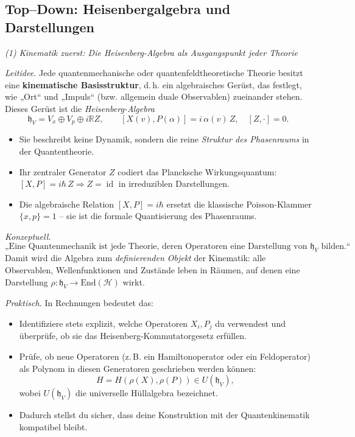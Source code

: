 \documentclass[10pt, letterpaper]{article}
\newcommand{\id}{\operatorname{id}}
\newcommand{\R}{\mathbb{R}}
\newcommand{\End}{\mathrm{End}}
\begin{document}
\pagebreak


\subsection{Top--Down: Heisenbergalgebra und Darstellungen}

\emph{(1) Kinematik zuerst: Die Heisenberg-Algebra als Ausgangspunkt jeder Theorie}

\emph{Leitidee.}
Jede quantenmechanische oder quantenfeldtheoretische Theorie besitzt eine
\textbf{kinematische Basisstruktur}, d.\,h. ein algebraisches Gerüst,
das festlegt, wie „Ort“ und „Impuls“ (bzw. allgemein duale Observablen)
zueinander stehen.
Dieses Gerüst ist die \emph{Heisenberg-Algebra}
\[
\mathfrak{h}_V = V_x \oplus V_p \oplus i\R Z,
\qquad [X(v),P(\alpha)] = i\,\alpha(v)\,Z,\quad [Z,\cdot]=0.
\]

\begin{itemize}
\item Sie beschreibt keine Dynamik, sondern die reine \emph{Struktur des Phasenraums}
      in der Quantentheorie.
\item Ihr zentraler Generator \(Z\) codiert das Plancksche Wirkungsquantum:
      \([X,P]=i\hbar\,Z\Rightarrow Z=\id\) in irreduziblen Darstellungen.
\item Die algebraische Relation \([X,P]=i\hbar\) ersetzt die klassische Poisson-Klammer
      \(\{x,p\}=1\) – sie ist die formale Quantisierung des Phasenraums.
\end{itemize}

\emph{Konzeptuell.}
\[
\text{„Eine Quantenmechanik ist jede Theorie, deren Operatoren eine Darstellung von }\mathfrak{h}_V\text{ bilden.“}
\]
Damit wird die Algebra zum \emph{definierenden Objekt} der Kinematik:
alle Observablen, Wellenfunktionen und Zustände leben in Räumen,
auf denen eine Darstellung \(\rho:\mathfrak{h}_V\to\End(\mathcal{H})\) wirkt.

\emph{Praktisch.}
In Rechnungen bedeutet das:
\begin{itemize}
\item Identifiziere stets explizit, welche Operatoren \(X_i,P_j\) du verwendest
      und überprüfe, ob sie das Heisenberg-Kommutatorgesetz erfüllen.
\item Prüfe, ob neue Operatoren (z.\,B. ein Hamiltonoperator oder ein Feldoperator)
      als Polynom in diesen Generatoren geschrieben werden können:
      \[
      H = H(\rho(X),\rho(P))\in U(\mathfrak{h}_V),
      \]
      wobei \(U(\mathfrak{h}_V)\) die universelle Hüllalgebra bezeichnet.
\item Dadurch stellst du sicher, dass deine Konstruktion mit der Quantenkinematik kompatibel bleibt.
\end{itemize}
\end{document}
